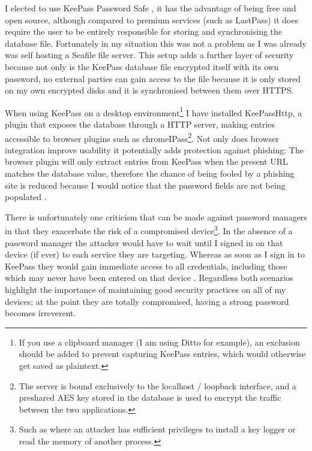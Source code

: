 \documentclass[11pt,a4paper]{scrartcl}
\begin{document}
\begin{refsection}
I elected to use KeePass Password Safe \cite{keepass}, it has the advantage of being free and open source, although compared to premium services (such as LastPass) it does require the user to be entirely responsible for storing and synchronising the database file. Fortunately in my situation this was not a problem as I was already was self hosting a Seafile file server. This setup adds a further layer of security because not only is the KeePass database file encrypted itself with its own password, no external parties can gain access to the file because it is only stored on my own encrypted disks and it is synchronised between them over HTTPS.

When using KeePass on a desktop environment\footnote{If you use a clipboard manager (I am using Ditto for example), an exclusion should be added to prevent capturing KeePass entries, which would otherwise get saved as plaintext.} 
I have installed KeePassHttp, a plugin that exposes the database through a HTTP server, making entries accessible to browser plugins such as chromeIPass\footnote{The server is bound exclusively to the localhost / loopback interface, and a preshared AES key stored in the database is used to encrypt the traffic between the two applications.}. Not only does browser integration improve usability it  potentially adds protection against phishing: The browser plugin will only extract entries from KeePass when the present URL matches the database value, therefore the chance of being fooled by a phishing site is reduced because I would notice that the password fields are not being populated \cite{ncsc_pass_managers}.

There is unfortunately one criticism that can be made against password managers in that they exacerbate the risk of a compromised device\footnote{Such as where an attacker has sufficient privileges to install a key logger or read the memory of another process.}.
In the absence of a password manager the attacker would have to wait until I signed in on that device (if ever) to each service they are targeting. 
Whereas as soon as I sign in to KeePass they would gain immediate access to all credentials, including those which may never have been entered on that device \cite{citadel_keepass}. Regardless both scenarios highlight the importance of maintaining good security practices on all of my devices; at the point they are totally compromised, having a strong password becomes irreverent.

\printbibliography
\end{refsection}
\end{document}
